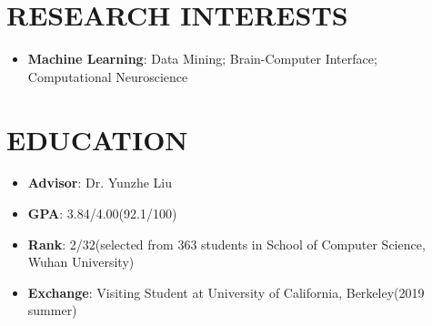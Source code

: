 \documentclass{resume}
\begin{document}


\section{{\bfseries RESEARCH INTERESTS}}
\begin{itemize}[parsep=0.2ex]
  \item \textbf{Machine Learning}: Data Mining; Brain-Computer Interface; Computational Neuroscience
\end{itemize}

\section{{\bfseries EDUCATION}}
\begin{itemize}[parsep=0.1ex]
  \item \textbf{Advisor}: Dr. Yunzhe Liu
\end{itemize}
\begin{itemize}[parsep=0.1ex]
  \item \textbf{GPA}: 3.84/4.00(92.1/100)
  \item \textbf{Rank}: 2/32(selected from 363 students in School of Computer Science, Wuhan University)
  \item \textbf{Exchange}: Visiting Student at University of California, Berkeley(2019 summer)
\end{itemize}

\end{document}
